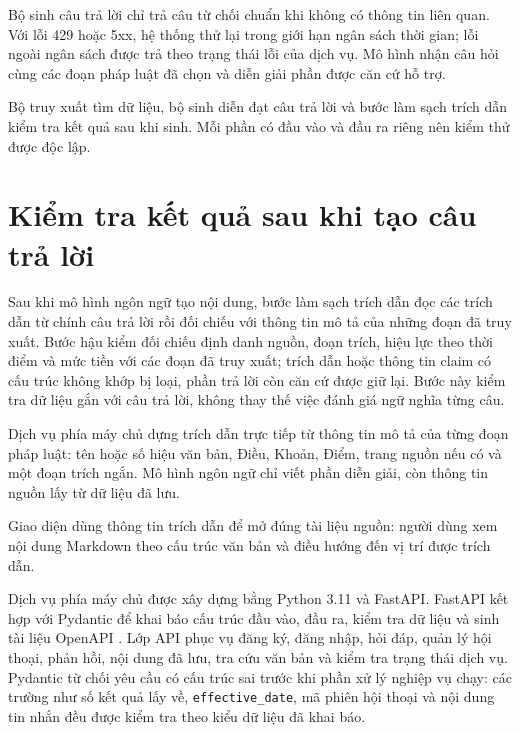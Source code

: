 \documentclass[12pt,a4paper,oneside]{report}
\begin{document}
Bộ sinh câu trả lời chỉ trả câu từ chối chuẩn khi không có thông tin liên quan. Với lỗi 429 hoặc 5xx, hệ thống thử lại trong giới hạn ngân sách thời gian; lỗi ngoài ngân sách được trả theo trạng thái lỗi của dịch vụ. Mô hình nhận câu hỏi cùng các đoạn pháp luật đã chọn và diễn giải phần được căn cứ hỗ trợ.

Bộ truy xuất tìm dữ liệu, bộ sinh diễn đạt câu trả lời và bước làm sạch trích dẫn kiểm tra kết quả sau khi sinh. Mỗi phần có đầu vào và đầu ra riêng nên kiểm thử được độc lập.



\section{Kiểm tra kết quả sau khi tạo câu trả lời}
Sau khi mô hình ngôn ngữ tạo nội dung, bước làm sạch trích dẫn đọc các trích dẫn từ chính câu trả lời rồi đối chiếu với thông tin mô tả của những đoạn đã truy xuất. Bước hậu kiểm đối chiếu định danh nguồn, đoạn trích, hiệu lực theo thời điểm và mức tiền với các đoạn đã truy xuất; trích dẫn hoặc thông tin claim có cấu trúc không khớp bị loại, phần trả lời còn căn cứ được giữ lại. Bước này kiểm tra dữ liệu gắn với câu trả lời, không thay thế việc đánh giá ngữ nghĩa từng câu.

Dịch vụ phía máy chủ dựng trích dẫn trực tiếp từ thông tin mô tả của từng đoạn pháp luật: tên hoặc số hiệu văn bản, Điều, Khoản, Điểm, trang nguồn nếu có và một đoạn trích ngắn. Mô hình ngôn ngữ chỉ viết phần diễn giải, còn thông tin nguồn lấy từ dữ liệu đã lưu.

Giao diện dùng thông tin trích dẫn để mở đúng tài liệu nguồn: người dùng xem nội dung Markdown theo cấu trúc văn bản và điều hướng đến vị trí được trích dẫn.


Dịch vụ phía máy chủ được xây dựng bằng Python 3.11 và FastAPI. FastAPI kết hợp với Pydantic để khai báo cấu trúc đầu vào, đầu ra, kiểm tra dữ liệu và sinh tài liệu OpenAPI \cite{fastapi_docs}. Lớp API phục vụ đăng ký, đăng nhập, hỏi đáp, quản lý hội thoại, phản hồi, nội dung đã lưu, tra cứu văn bản và kiểm tra trạng thái dịch vụ. Pydantic từ chối yêu cầu có cấu trúc sai trước khi phần xử lý nghiệp vụ chạy: các trường như số kết quả lấy về, \texttt{effective\_date}, mã phiên hội thoại và nội dung tin nhắn đều được kiểm tra theo kiểu dữ liệu đã khai báo.
\end{document}
